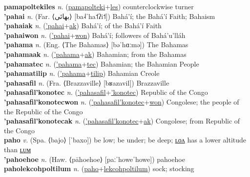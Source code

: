 \textbf{pamapoltekiles} \textit{n.} (\hyperref[pamapolteki]{pamapolteki}+\hyperref[les]{les})
counterclockwise turner \label{pamapoltekiles} \\
\textbf{'pahai} \textit{n.} (Far. ⟨بهائی‎⟩ [ba˨ˈha˦ʔi˦])
Bahá'í; the Bahá'í Faith; Bahaism \label{'pahai} \\
\textbf{'pahaiak} \textit{n.} (\hyperref['pahai]{'pahai}+\hyperref[ak]{ak})
Bahá'í; of the Bahá'í Faith \label{'pahaiak} \\
\textbf{'pahaiwon} \textit{n.} (\hyperref['pahai]{'pahai}+\hyperref[won]{won})
Bahá'í; followers of Bahá'u'lláh \label{'pahaiwon} \\
\textbf{'pahama} \textit{n.} (Eng. ⟨The Bahamas⟩ [bəˈhɑːmə])
The Bahamas \label{'pahama} \\
\textbf{'pahamaak} \textit{n.} (\hyperref['pahama]{'pahama}+\hyperref[ak]{ak})
Bahamian; from the Bahamas \label{'pahamaak} \\
\textbf{'pahamatec} \textit{n.} (\hyperref['pahama]{'pahama}+\hyperref[tec]{tec})
Bahamian; the Bahamian People \label{'pahamatec} \\
\textbf{'pahamatilip} \textit{n.} (\hyperref['pahama]{'pahama}+\hyperref[tilip]{tilip})
Bahamian Creole \label{'pahamatilip} \\
\textbf{'pahasafil} \textit{n.} (Fra. ⟨Brazzaville⟩ [bʁazavil])
Brazzaville \label{'pahasafil} \\
\textbf{'pahasafil'konotec} \textit{n.} (\hyperref['pahasafil]{'pahasafil}+\hyperref['konotec]{'konotec})
Republic of the Congo \label{'pahasafil'konotec} \\
\textbf{'pahasafil'konotecwon} \textit{n.} (\hyperref['pahasafil'konotec]{'pahasafil'konotec}+\hyperref[won]{won})
Congolese; the people of the Republic of the Congo \label{'pahasafil'konotecwon} \\
\textbf{'pahasafil'konotecak} \textit{n.} (\hyperref['pahasafil'konotec]{'pahasafil'konotec}+\hyperref[ak]{ak})
Congolese; from Republic of the Congo \label{'pahasafil'konotecak} \\
\textbf{paho} \textit{v.} (Spa. ⟨bajo⟩ [ˈbaxo])
be low; be under; be deep; \hyperref[paholon]{ʟᴏᴧ} has a lower altitude than \hyperref[paholum]{ʟᴜᴍ} \label{paho} \\
\textbf{'pahoehoe} \textit{n.} (Haw. ⟨pāhoehoe⟩ [paːˈhoweˈhowe])
pahoehoe \label{'pahoehoe} \\
\textbf{paholekcohpoltilum} \textit{n.} (\hyperref[paho]{paho}+\hyperref[lekcohpoltilum]{lekcohpoltilum})
sock; stocking \label{paholekcohpoltilum} \\
